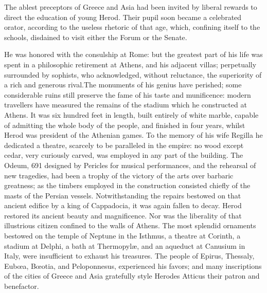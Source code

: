 
The ablest preceptors of Greece and Asia had been invited by
liberal rewards to direct the education of young Herod. Their
pupil soon became a celebrated orator, according to the useless
rhetoric of that age, which, confining itself to the schools,
disdained to visit either the Forum or the Senate.

He was honored with the consulship at Rome: but the greatest part
of his life was spent in a philosophic retirement at Athens, and
his adjacent villas; perpetually surrounded by sophists, who
acknowledged, without reluctance, the superiority of a rich and
generous rival.\footnotemark[69] The monuments of his genius have perished;
some considerable ruins still preserve the fame of his taste and
munificence: modern travellers have measured the remains of the
stadium which he constructed at Athens. It was six hundred feet
in length, built entirely of white marble, capable of admitting
the whole body of the people, and finished in four years, whilst
Herod was president of the Athenian games. To the memory of his
wife Regilla he dedicated a theatre, scarcely to be paralleled in
the empire: no wood except cedar, very curiously carved, was
employed in any part of the building. The Odeum, 691 designed by
Pericles for musical performances, and the rehearsal of new
tragedies, had been a trophy of the victory of the arts over
barbaric greatness; as the timbers employed in the construction
consisted chiefly of the masts of the Persian vessels.
Notwithstanding the repairs bestowed on that ancient edifice by a
king of Cappadocia, it was again fallen to decay. Herod restored
its ancient beauty and magnificence. Nor was the liberality of
that illustrious citizen confined to the walls of Athens. The
most splendid ornaments bestowed on the temple of Neptune in the
Isthmus, a theatre at Corinth, a stadium at Delphi, a bath at
Thermopylæ, and an aqueduct at Canusium in Italy, were
insufficient to exhaust his treasures. The people of Epirus,
Thessaly, Eubœa, Bœotia, and Peloponnesus, experienced his
favors; and many inscriptions of the cities of Greece and Asia
gratefully style Herodes Atticus their patron and benefactor.\footnotemark[70]



